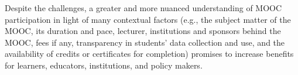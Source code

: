 Despite the challenges, a greater and more nuanced understanding of MOOC
participation in light of many contextual factors (e.g., the subject
matter of the MOOC, its duration and pace, lecturer, institutions and
sponsors behind the MOOC, fees if any, transparency in students’ data
collection and use, and the availability of credits or certificates for
completion) promises to increase benefits for learners, educators,
institutions, and policy makers.

